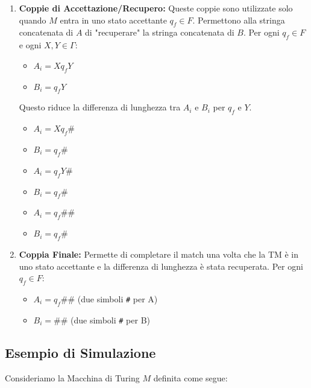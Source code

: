 \documentclass[a4paper]{article}
\theoremstyle{definition} %
\theoremstyle{remark} %
\begin{document}
\begin{enumerate}
    \item \textbf{Coppie di Accettazione/Recupero:}
    Queste coppie sono utilizzate solo quando $M$ entra in uno stato accettante $q_f \in F$. Permettono alla stringa concatenata di $A$ di "recuperare" la stringa concatenata di $B$.
    Per ogni $q_f \in F$ e ogni $X, Y \in \Gamma$:
    \begin{itemize}
        \item $A_i = Xq_f Y$
        \item $B_i = q_f Y$
    \end{itemize}
    Questo riduce la differenza di lunghezza tra $A_i$ e $B_i$ per $q_f$ e $Y$.
    \begin{itemize}
        \item $A_i = Xq_f \#$
        \item $B_i = q_f \#$
    \end{itemize}
    \begin{itemize}
        \item $A_i = q_f Y \#$
        \item $B_i = q_f \#$
    \end{itemize}
    \begin{itemize}
        \item $A_i = q_f \# \#$
        \item $B_i = q_f \#$
    \end{itemize}

    \item \textbf{Coppia Finale:}
    Permette di completare il match una volta che la TM è in uno stato accettante e la differenza di lunghezza è stata recuperata.
    Per ogni $q_f \in F$:
    \begin{itemize}
        \item $A_i = q_f \# \#$ (due simboli \texttt{\#} per A)
        \item $B_i = \# \#$ (due simboli \texttt{\#} per B)
    \end{itemize}
\end{enumerate}

\subsection{Esempio di Simulazione}

Consideriamo la Macchina di Turing $M$ definita come segue:
\end{document}
